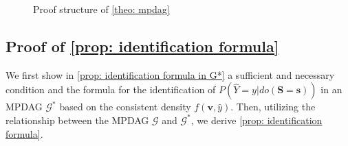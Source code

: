 \documentclass{article} %
\begin{document}
\begin{figure}[htp]
\vskip -0.2in
\begin{center}
\caption{Proof structure of \cref{theo: mpdag}}
\label{fig: Proof structure of theo}
\end{center}
\end{figure}


\subsection{Proof of \cref{prop: identification formula}} \label{proof_prop: identification formula}
We first show in \cref{prop: identification formula in G*} a sufficient and necessary condition and the formula for the identification of $P(\hat{Y}=y|do(\mathbf{S}=\mathbf{s}))$ in an MPDAG $\mathcal{G^*}$ based on the consistent density $f(\mathbf{v}, \hat{y})$. Then, utilizing the relationship between the MPDAG $\mathcal{G}$ and $\mathcal{G^*}$, we derive \cref{prop: identification formula}.
\end{document}
